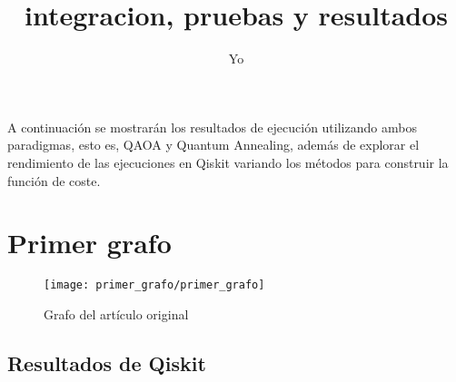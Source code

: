 \documentclass{article}
\title{integracion, pruebas y resultados}
\author{Yo}
\begin{document}
\maketitle{}
\tableofcontents{}

\newpage

A continuación se mostrarán los resultados de ejecución utilizando ambos paradigmas, esto es, QAOA y Quantum Annealing, además de explorar el rendimiento de las ejecuciones en Qiskit variando los métodos para construir la función de coste.

\section{Primer grafo}
\label{sec:primer-grafo}

\begin{figure}[htbp]
  \centering
  \texttt{[image: primer\_grafo/primer\_grafo]}
  \caption{Grafo del artículo original} \label{fig:primer_grafo/primer_grafo}
\end{figure}


\subsection{Resultados de Qiskit}
\label{sec:resultados-de-qiskit}
\end{document}
